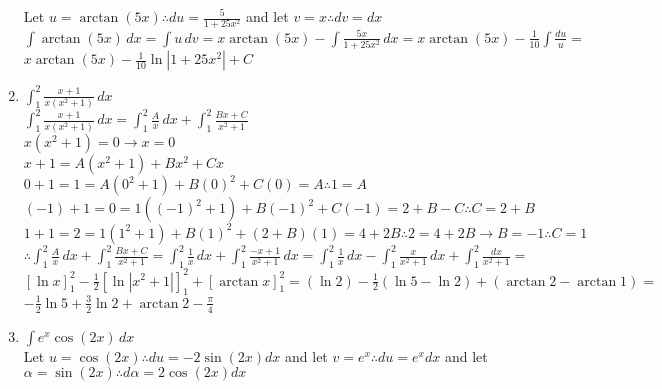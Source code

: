 \documentclass[10pt, letterpaper]{report}
\begin{document}
\begin{enumerate}
    Let $u=\arctan{(5x)} \therefore du=\frac{5}{1+25x^{2}}$ and let $v=x\therefore dv=dx$ \\
    
    $\int{\arctan{(5x)}}\,dx=
    \int{u}\,dv=
    x\arctan{(5x)}-\int{\frac{5x}{1+25x^{2}}}\,dx=
    x\arctan{(5x)}-\frac{1}{10}\int{\frac{du}{u}}=$ \\
    
    $x\arctan{(5x)}-\frac{1}{10}\ln{\left|1+25x^{2}\right|}+C$ \\
    \pagebreak 
    
  \item{$\int_{1}^{2}{\frac{x+1}{x(x^{2}+1)}}\,dx$} \\
  
    $\int_{1}^{2}{\frac{x+1}{x(x^{2}+1)}}\,dx=\int_{1}^{2}{\frac{A}{x}}\,dx+\int_{1}^{2}{\frac{Bx+C}{x^{2}+1}}$ \\
    
    $x(x^{2}+1)=0\rightarrow x=0$ \\
    
    $x+1=A(x^{2}+1)+Bx^{2}+Cx$ \\
    
    $0+1=1=A(0^{2}+1)+B(0)^{2}+C(0)=A\therefore 1=A$ \\
    
    $(-1)+1=0=1((-1)^{2}+1)+B(-1)^{2}+C(-1)=2+B-C\therefore C=2+B$ \\
    
    $1+1=2=1(1^{2}+1)+B(1)^{2}+(2+B)(1)=4+2B\therefore 2=4+2B\rightarrow B=-1\therefore C=1$ \\
    
    $\therefore \int_{1}^{2}{\frac{A}{x}}\,dx+\int_{1}^{2}{\frac{Bx+C}{x^{2}+1}}=
    \int_{1}^{2}{\frac{1}{x}}\,dx+\int_{1}^{2}{\frac{-x+1}{x^{2}+1}}\,dx=
    \int_{1}^{2}{\frac{1}{x}}\,dx-\int_{1}^{2}{\frac{x}{x^{2}+1}}\,dx+\int_{1}^{2}{\frac{dx}{x^{2}+1}}=$ \\
    
    $[\ln{x}]_{1}^{2}-\frac{1}{2}[\ln{|x^{2}+1|}]_{1}^{2}+[\arctan{x}]_{1}^{2}=
    (\ln{2})-\frac{1}{2}(\ln{5}-\ln{2})+(\arctan{2}-\arctan{1})=$ \\
    
    
    $-\frac{1}{2}\ln{5}+\frac{3}{2}\ln{2}+\arctan{2}-\frac{\pi}{4}$ \\ 
    
  \item{$\int{e^{x}\cos{(2x)}}\,dx$} \\
  
    Let $u=\cos{(2x)}\therefore du=-2\sin{(2x)}dx$ and let $v=e^{x}\therefore du=e^{x}dx$ and let $\alpha=\sin{(2x)}\therefore d\alpha=2\cos{(2x)}dx$ \\
    

\end{enumerate}
\end{document}
